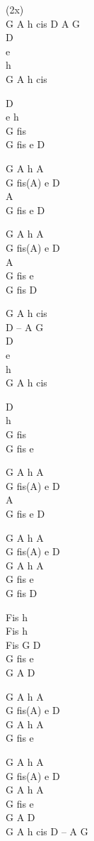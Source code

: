 \begin{chord}
    (2x)\\
    G A h cis D A G\\
    D\\
    e\\
    h\\
    G A h cis

    D\\
    e h\\
    G fis\\
    G fis e D

    \OneColVin G A h A\\
    \OneColVin G fis(A) e D\\
    \OneColVin A\\
    \OneColVin G fis e D

    \OneColVin G A h A\\
    \OneColVin G fis(A) e D\\
    \OneColVin A\\
    \OneColVin G fis e\\
    \OneColVin G fis D

    G A h cis\ifOneCol \else \\ \fi D – A G\\
    D\\
    e\\
    h\\
    G A h cis

    D\\
    h\\
    G fis\\
    G fis e

    \OneColVin G A h A\\
    \OneColVin G fis(A) e D\\
    \OneColVin A\\
    \OneColVin G fis e D

    \OneColVin G A h A\\
    \OneColVin G fis(A) e D\\
    \OneColVin G A h A\\
    \OneColVin G fis e\\
    \OneColVin G fis D

Fis h\\
Fis h\\
Fis G D\\
G fis e\\
G A D

\OneColVin G A h A\\
\OneColVin G fis(A) e D\\
\OneColVin G A h A\\
\OneColVin G fis e

\OneColVin G A h A\\
\OneColVin G fis(A) e D\\
\OneColVin G A h A\\
\OneColVin G fis e\\
\OneColVin G A D\\
G A h cis D – A G
\end{chord}
